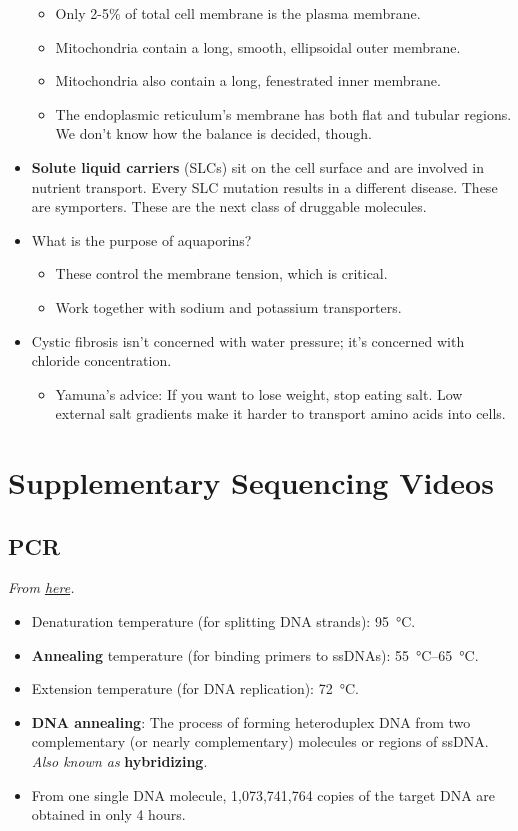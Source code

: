 \documentclass[../notes.tex]{subfiles}
\begin{document}
\begin{itemize}
    \begin{itemize}
        \item Only 2-5\% of total cell membrane is the plasma membrane.
        \item Mitochondria contain a long, smooth, ellipsoidal outer membrane.
        \item Mitochondria also contain a long, fenestrated inner membrane.
        \item The endoplasmic reticulum's membrane has both flat and tubular regions. We don't know how the balance is decided, though.
    \end{itemize}
    \item \textbf{Solute liquid carriers} (SLCs) sit on the cell surface and are involved in nutrient transport. Every SLC mutation results in a different disease. These are symporters. These are the next class of druggable molecules.
    \item What is the purpose of aquaporins?
    \begin{itemize}
        \item These control the membrane tension, which is critical.
        \item Work together with sodium and potassium transporters.
    \end{itemize}
    \item Cystic fibrosis isn't concerned with water pressure; it's concerned with chloride concentration.
    \begin{itemize}
        \item Yamuna's advice: If you want to lose weight, stop eating salt. Low external salt gradients make it harder to transport amino acids into cells.
    \end{itemize}
\end{itemize}



\section{Supplementary Sequencing Videos}
\subsection*{PCR}
\emph{From \href{https://youtu.be/iQsu3Kz9NYo}{here}.}
\begin{itemize}
    \item {}Denaturation temperature (for splitting DNA strands): \SI{95}{\celsius}.
    \item \textbf{Annealing} temperature (for binding primers to ssDNAs): \SIrange{55}{65}{\celsius}.
    \item Extension temperature (for DNA replication): \SI{72}{\celsius}.
    \item \textbf{DNA annealing}: The process of forming heteroduplex DNA from two complementary (or nearly complementary) molecules or regions of ssDNA. \emph{Also known as} \textbf{hybridizing}.
    \item From one single DNA molecule, 1,073,741,764 copies of the target DNA are obtained in only 4 hours.
\end{itemize}
\end{document}
